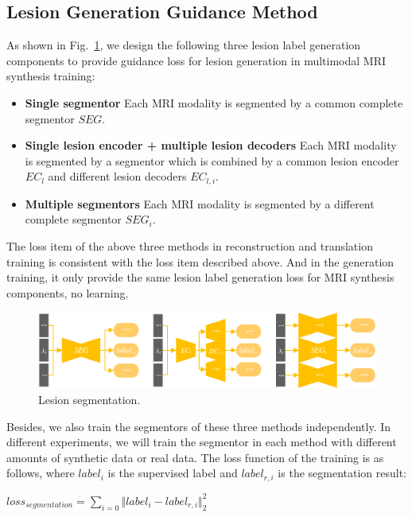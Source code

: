 \documentclass[letterpaper]{article} %
\begin{document}
\subsection{Lesion Generation Guidance Method}
\label{label gen methods}
As shown in Fig.~\ref{segmentation}, we design the following three lesion label generation components to provide guidance loss for lesion generation in multimodal MRI synthesis training:
\begin{itemize}
	\item \textbf{Single segmentor} 
	Each MRI modality  is segmented by a common complete segmentor $SEG$.
	\item \textbf{Single lesion encoder + multiple lesion decoders} 
	Each MRI modality  is segmented by a segmentor which is combined by a common lesion encoder $EC_{l}$ and different lesion decoders $EC_{l,i}$. 
	\item \textbf{Multiple segmentors} 
	Each MRI modality  is segmented by a different complete segmentor $SEG_i$.
\end{itemize}
The loss item of the above three methods in reconstruction and translation training is consistent with the loss item described above. And in the generation training, it only provide the same lesion label generation loss for MRI synthesis components, no learning.

\begin{figure}
	\centering
	\includegraphics[width=0.8\columnwidth]{figures/segmentation}
	\caption{Lesion segmentation.}
	\label{segmentation}
\end{figure}
Besides, we also train the segmentors of these three methods independently. In different experiments, we will train the segmentor in each method with different amounts of synthetic data or real data. The loss function of the training is as follows, where $label_i$ is the supervised label and $label_{r,i}$ is the segmentation result:
\begin{center}
	$loss_{segmentation}=\sum\limits_{i=0}\Vert{label_i-label_{r,i}}\Vert_{2}^{2}$
\end{center}
\end{document}
